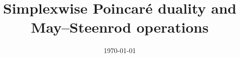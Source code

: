 \documentclass{amsart}
\title[Short title]{Simplexwise Poincar\'e duality and May--Steenrod operations}
\date{\today}
\begin{document}
	
	\maketitle
	
	
	
	
	
	
	
	
	
	
	\sloppy
	\printbibliography
\end{document}
